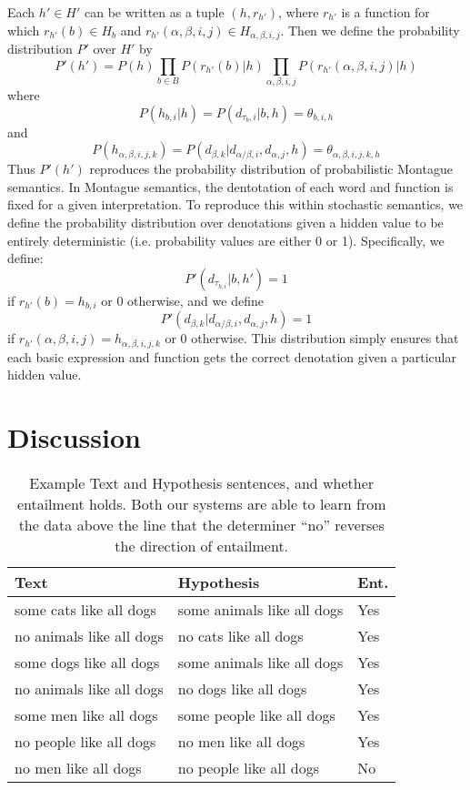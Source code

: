 \documentclass[manuscript]{clv2}
\begin{document}
Each $h'\in H'$ can be written as a tuple $(h, r_{h'})$, where
$r_{h'}$ is a function for which $r_{h'}(b) \in H_b$ and
$r_{h'}(\alpha, \beta, i, j) \in H_{\alpha, \beta, i, j}$. Then we
define the probability distribution $P'$ over $H'$ by
$$P'(h') = P(h) \prod_{b\in B} P(r_{h'}(b)|h)  \prod_{\alpha,\beta,i,j} P(r_{h'}(\alpha,\beta,i,j)|h)$$
where
$$P(h_{b,i}|h) = P(d_{\tau_b,i}|b,h) = \theta_{b,i,h}$$
and
$$P(h_{\alpha,\beta,i,j,k})=P(d_{\beta,k}|d_{\alpha/\beta,i},d_{\alpha,j},h) = \theta_{\alpha,\beta,i,j,k,h}$$
Thus $P'(h')$ reproduces the probability distribution of probabilistic
Montague semantics. In Montague semantics, the dentotation of each
word and function is fixed for a given interpretation. To reproduce
this within stochastic semantics, we define the probability
distribution over denotations given a hidden value to be entirely
deterministic (i.e. probability values are either 0 or
1). Specifically, we define:
$$P'(d_{\tau_{b,i}}|b, h') = 1$$
if $r_{h'}(b) = h_{b,i}$ or 0 otherwise, and we define
$$P'(d_{\beta,k}|d_{\alpha/\beta,i}, d_{\alpha,j},h) = 1$$
if $r_{h'}(\alpha,\beta,i,j) = h_{\alpha,\beta,i,j,k}$ or 0
otherwise. This distribution simply ensures that each basic expression
and function gets the correct denotation given a particular hidden
value.



\section{Discussion}

\begin{table}
  \begin{center}
    \begin{tabular}{l|l|l}
      Text & Hypothesis & Ent.\\
      \hline
      some cats like all dogs & some animals like all dogs & Yes\\
      no animals like all dogs & no cats like all dogs & Yes\\
      some dogs like all dogs & some animals like all dogs & Yes\\
      no animals like all dogs & no dogs like all dogs & Yes\\
      some men like all dogs & some people like all dogs & Yes\\
      \hline
      no people like all dogs & no men like all dogs & Yes\\
      no men like all dogs & no people like all dogs & No\\
    \end{tabular}
    \vspace{0.2cm}
    \caption{Example Text and Hypothesis sentences, and whether
      entailment holds. Both our systems are able to learn from the
      data above the line that the determiner ``no'' reverses the
      direction of entailment.}
    \label{table:mono}
  \end{center}
\end{table}
\end{document}
